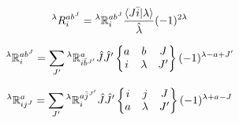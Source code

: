 \documentclass[thesis.tex]{subfiles}
\begin{document}
\begin{equation}
\begin{equation}
  {}^{\lambda}R^{ab^{J}}_{i} = {}^{\lambda}\mathbb{R}^{ab^{J}}_{i}\frac{\braket{J\bar{i}}{\lambda}}{\hat{\lambda}}(-1)^{2\lambda}
\end{equation}

\begin{equation}
  {}^{\lambda}\mathbb{R}^{ab^{J}}_{i} = \sum_{J'}{}^{\lambda}\mathbb{R}^{a}_{i\bar{b}^{J'}}\hat{J}\hat{J}'\begin{Bmatrix} a & b & J \\ i & \lambda & J' \end{Bmatrix}(-1)^{\lambda - a + J'}
\end{equation}

\begin{equation}
  {}^{\lambda}\mathbb{R}^{a}_{ij^{J}} = \sum_{J'}{}^{\lambda}\mathbb{R}^{a\bar{j}^{J'}}_{i}\hat{J}\hat{J}'\begin{Bmatrix} i & j & J \\ a & \lambda & J' \end{Bmatrix}(-1)^{\lambda + a - J}
\end{equation}
\end{document}
